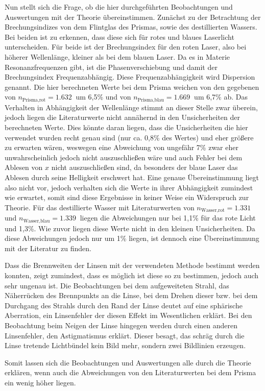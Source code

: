 		Nun stellt sich die Frage, ob die hier durchgeführten Beobachtungen und Auswertungen mit der Theorie übereinstimmen.
		Zunächst zu der Betrachtung der Brechungsindizes von dem Flintglas des Prismas, sowie des destillierten Wassers.
		Bei beiden ist zu erkennen, dass diese sich für rotes und blaues Laserlicht unterscheiden.
		Für beide ist der Brechungsindex für den roten Laser, also bei höherer Wellenlänge, kleiner als bei dem blauen Laser.
		Da es in Materie Resonanzfrequenzen gibt, ist die Phasenverschiebung und damit der Brechungsindex Frequenzabhängig.
		Diese Frequenzabhängigkeit wird Dispersion genannt.
		Die hier berechneten Werte bei dem Prisma weichen von den gegebenen\cite{WWU} von $n_\text{Prisma,rot} = \SI{1,632}{}$ um 6,5\% und von $n_\text{Prisma,blau} = \SI{1,669}{}$ um 6,7\% ab.
		Das Verhalten in Abhängigkeit der Wellenlänge stimmt an dieser Stelle zwar überein, jedoch liegen die Literaturwerte nicht annähernd in den Unsicherheiten der berechneten Werte.
		Dies könnte daran liegen, dass die Unsicherheiten die hier verwendet wurden recht genau sind (nur ca. 0,8\% des Wertes) und eher größere zu erwarten wären, weswegen eine Abweichung von ungefähr 7\% zwar eher unwahrscheinlich jedoch nicht auszuschließen wäre und auch Fehler bei dem Ablesen von $x$ nicht auszuschließen sind, da besonders der blaue Laser das Ablesen durch seine Helligkeit erschwert hat.
		Eine genaue Übereinstimmung liegt also nicht vor, jedoch verhalten sich die Werte in ihrer Abhängigkeit zumindest wie erwartet, somit sind diese Ergebnisse in keiner Weise ein Widerspruch zur Theorie.
		Für das destillierte Wasser mit Literaturwerten\cite{Refrac} von $n_\text{Wasser,rot} = \SI{1.331}{}$ und $n_\text{Wasser,blau} = \SI{1.339}{}$ liegen die Abweichungen nur bei 1,1\% für das rote Licht und 1,3\%.
		Wie zuvor liegen diese Werte nicht in den kleinen Unsicherheiten.
		Da diese Abweichungen jedoch nur um 1\% liegen, ist dennoch eine Übereinstimmung mit der Literatur zu finden.
		
		Dass die Brennweiten der Linsen mit der verwendeten Methode bestimmt werden konnten, zeigt zumindest, dass es möglich ist diese so zu bestimmen, jedoch auch sehr ungenau ist.
		Die Beobachtungen bei dem aufgeweiteten Strahl, das Näherrücken des Brennpunkts an die Linse, bei dem Drehen dieser bzw. bei dem Durchgang des Strahls durch den Rand der Linse deutet auf eine sphärische Aberration, ein Linsenfehler der diesen Effekt im Wesentlichen erklärt.
		Bei den Beobachtung beim Neigen der Linse hingegen werden durch einen anderen Linsenfehler, den Astigmatismus erklärt.
		Dieser besagt, das schräg durch die Linse tretende Lichtbündel kein Bild mehr, sondern zwei Bildlinien erzeugen.
		
		Somit lassen sich die Beobachtungen und Auswertungen alle durch die Theorie erklären, wenn auch die Abweichungen von den Literaturwerten bei dem Prisma ein wenig höher liegen.